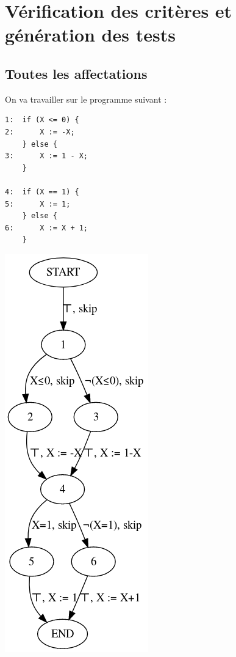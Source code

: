 \documentclass[a4paper, 12pt]{report}
\begin{document}
\chapter{Vérification des critères et génération des tests}

\section{Toutes les affectations}
\label{sec:affectations}
On va travailler sur le programme suivant :

\begin{minipage}{0.46\textwidth}
\begin{verbatim}
1:  if (X <= 0) {
2:      X := -X;
    } else {
3:      X := 1 - X;
    }

4:  if (X == 1) {
5:      X := 1;
    } else {
6:      X := X + 1;
    }
\end{verbatim}
\end{minipage}
\begin{minipage}{0.46\textwidth}
	\includegraphics[scale=0.5]{pics/simpleCFG.png}
\end{minipage}
\end{document}
